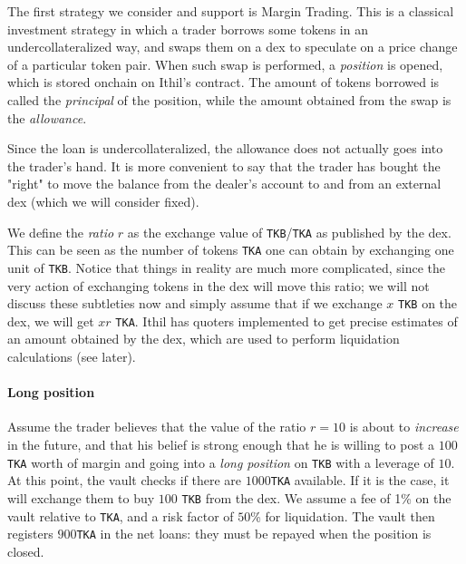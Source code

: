 \documentclass[a4paper,10 pt]{article}
\theoremstyle{definition}
\begin{document}
The first strategy we consider and support is Margin Trading. This is a classical investment strategy in which a trader borrows some tokens in an undercollateralized way, and swaps them on a dex to speculate on a price change of a particular token pair. When such swap is performed, a {\it position} is opened, which is stored onchain on Ithil's contract. The amount of tokens borrowed is called the {\it principal} of the position, while the amount obtained from the swap is the {\it allowance}.

Since the loan is undercollateralized, the allowance does not actually goes into the trader's hand. It is more convenient to say that the trader has bought the "right" to move the balance from the dealer's account to and from an external dex (which we will consider fixed).

We define the {\it ratio} $r$ as the exchange value of \verb|TKB|/\verb|TKA| as published by the dex. This can be seen as the number of tokens \verb|TKA| one can obtain by exchanging one unit of \verb|TKB|. Notice that things in reality are much more complicated, since the very action of exchanging tokens in the dex will move this ratio; we will not discuss these subtleties now and simply assume that if we exchange $x$ \verb|TKB| on the dex, we will get $xr$ \verb|TKA|. Ithil has quoters implemented to get precise estimates of an amount obtained by the dex, which are used to perform liquidation calculations (see later).

\paragraph{Long position}

Assume the trader believes that the value of the ratio $r = 10$ is about to \emph{increase} in the future, and that his belief is strong enough that he is willing to post a $100$\verb|TKA| worth of margin and going into a \emph{long position} on \verb|TKB| with a leverage of $10$. At this point, the vault checks if there are $1000$\verb|TKA| available. If it is the case, it will exchange them to buy $100$ \verb|TKB| from the dex. We assume a fee of 1\% on the vault relative to \verb|TKA|, and a risk factor of $50$\% for liquidation. The vault then registers $900$\verb|TKA| in the net loans: they must be repayed when the position is closed.
\end{document}
